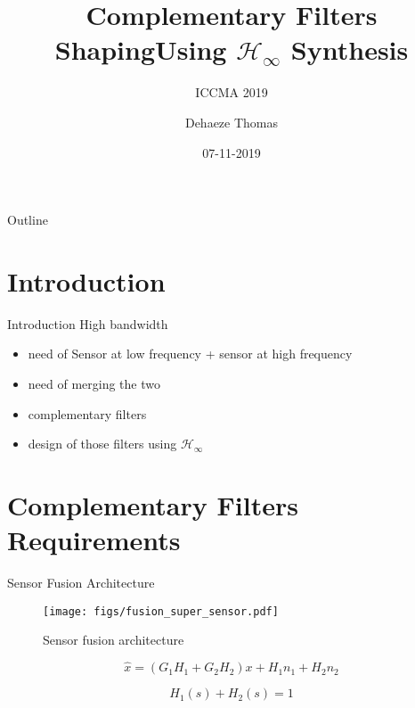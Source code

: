 \documentclass[t]{clean-beamer}
\author{Dehaeze Thomas}
\date{07-11-2019}
\title{Complementary Filters Shaping\newline Using \(\mathcal{H}_\infty\) Synthesis}
\subtitle{ICCMA 2019}
\begin{document}
\maketitle
\begin{frame}{Outline}
\tableofcontents
\end{frame}


\section{Introduction}
\label{sec:org4eff5bb}
\label{sec:introduction}

\begin{frame}[label={sec:org6dbc4f9}]{Introduction}
High bandwidth
\begin{itemize}
\item need of Sensor at low frequency + sensor at high frequency
\item need of merging the two
\item complementary filters
\item design of those filters using \(\mathcal{H}_\infty\)
\end{itemize}
\end{frame}

\section{Complementary Filters Requirements}
\label{sec:org49f4bb1}
\label{sec:requirements}
\begin{frame}[label={sec:orgd4e76ba}]{Sensor Fusion Architecture}
\label{sec:sensor_fusion}

\begin{figure}[htbp]
\centering
\texttt{[image: figs/fusion\_super\_sensor.pdf]}
\caption{\label{fig:fusion_super_sensor}
Sensor fusion architecture}
\end{figure}

\begin{equation}
\label{eq:comp_filter_estimate}
  \hat{x} = \left(G_1 H_1 + G_2 H_2\right) x + H_1 n_1 + H_2 n_2
\end{equation}

\begin{equation}
\label{eq:comp_filter}
  H_1(s) + H_2(s) = 1
\end{equation}
\end{frame}
\end{document}
